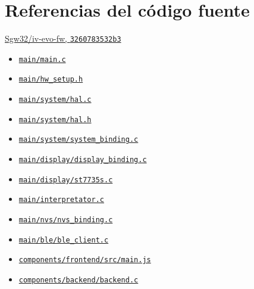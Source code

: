 \section{Referencias del código fuente}
\href{https://github.com/Sgw32/iv-evo-fw/tree/3260783532b3d4ad8529b23f4e907c0a6ab03262}{Sgw32/iv-evo-fw, \texttt{3260783532b3}}
\begin{itemize}
\item \href{https://github.com/Sgw32/iv-evo-fw/blob/3260783532b3d4ad8529b23f4e907c0a6ab03262/main/main.c}{\nolinkurl{main/main.c}}
\item \href{https://github.com/Sgw32/iv-evo-fw/blob/3260783532b3d4ad8529b23f4e907c0a6ab03262/main/hw_setup.h}{\nolinkurl{main/hw_setup.h}}
\item \href{https://github.com/Sgw32/iv-evo-fw/blob/3260783532b3d4ad8529b23f4e907c0a6ab03262/main/system/hal.c}{\nolinkurl{main/system/hal.c}}
\item \href{https://github.com/Sgw32/iv-evo-fw/blob/3260783532b3d4ad8529b23f4e907c0a6ab03262/main/system/hal.h}{\nolinkurl{main/system/hal.h}}
\item \href{https://github.com/Sgw32/iv-evo-fw/blob/3260783532b3d4ad8529b23f4e907c0a6ab03262/main/system/system_binding.c}{\nolinkurl{main/system/system_binding.c}}
\item \href{https://github.com/Sgw32/iv-evo-fw/blob/3260783532b3d4ad8529b23f4e907c0a6ab03262/main/display/display_binding.c}{\nolinkurl{main/display/display_binding.c}}
\item \href{https://github.com/Sgw32/iv-evo-fw/blob/3260783532b3d4ad8529b23f4e907c0a6ab03262/main/display/st7735s.c}{\nolinkurl{main/display/st7735s.c}}
\item \href{https://github.com/Sgw32/iv-evo-fw/blob/3260783532b3d4ad8529b23f4e907c0a6ab03262/main/interpretator.c}{\nolinkurl{main/interpretator.c}}
\item \href{https://github.com/Sgw32/iv-evo-fw/blob/3260783532b3d4ad8529b23f4e907c0a6ab03262/main/nvs/nvs_binding.c}{\nolinkurl{main/nvs/nvs_binding.c}}
\item \href{https://github.com/Sgw32/iv-evo-fw/blob/3260783532b3d4ad8529b23f4e907c0a6ab03262/main/ble/ble_client.c}{\nolinkurl{main/ble/ble_client.c}}
\item \href{https://github.com/Sgw32/iv-evo-fw/blob/3260783532b3d4ad8529b23f4e907c0a6ab03262/components/frontend/src/main.js}{\nolinkurl{components/frontend/src/main.js}}
\item \href{https://github.com/Sgw32/iv-evo-fw/blob/3260783532b3d4ad8529b23f4e907c0a6ab03262/components/backend/backend.c}{\nolinkurl{components/backend/backend.c}}

\end{itemize}
